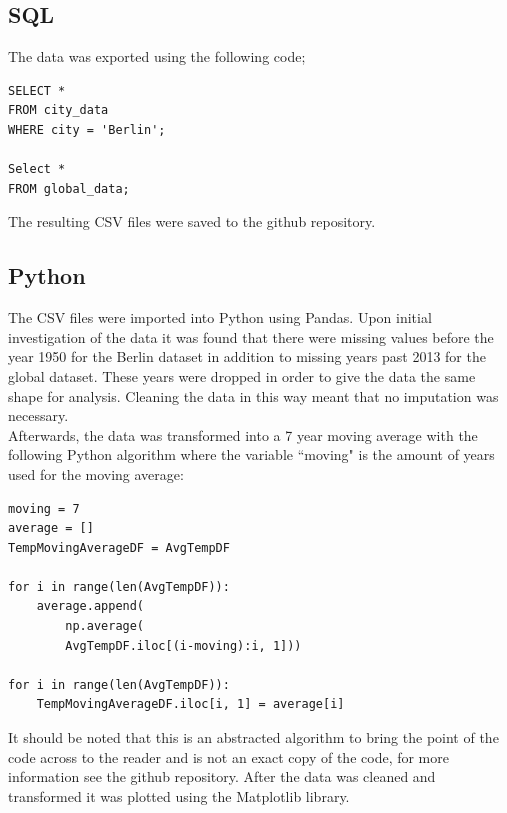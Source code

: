 \documentclass[journal, a4paper]{IEEEtran}
\begin{document}
    \subsection{SQL}
    
    The data was exported using the following code;
    
    \begin{small}
    \begin{lstlisting}
SELECT *
FROM city_data
WHERE city = 'Berlin';
    
Select *
FROM global_data;
    \end{lstlisting}
    \end{small}
    
    The resulting CSV files were saved to the github repository.
    
    \subsection{Python}
    
    The CSV files were imported into Python using Pandas. Upon initial investigation of the data it was found that there were missing values before the year 1950 for the Berlin dataset in addition to missing years past 2013 for the global dataset. These years were dropped in order to give the data the same shape for analysis. Cleaning the data in this way meant that no imputation was necessary.\\
    
    Afterwards, the data was transformed into a 7 year moving average with the following Python algorithm where the variable ``moving" is the amount of years used for the moving average:
    
    \begin{small}
    \begin{lstlisting}
moving = 7
average = []
TempMovingAverageDF = AvgTempDF

for i in range(len(AvgTempDF)):
    average.append(
    	np.average(
        AvgTempDF.iloc[(i-moving):i, 1]))
    
for i in range(len(AvgTempDF)):   
	TempMovingAverageDF.iloc[i, 1] = average[i]
    \end{lstlisting}
    \end{small}
    
    It should be noted that this is an abstracted algorithm to bring the point of the code across to the reader and is not an exact copy of the code, for more information see the github repository. After the data was cleaned and transformed it was plotted using the Matplotlib library.
    
\end{document}
